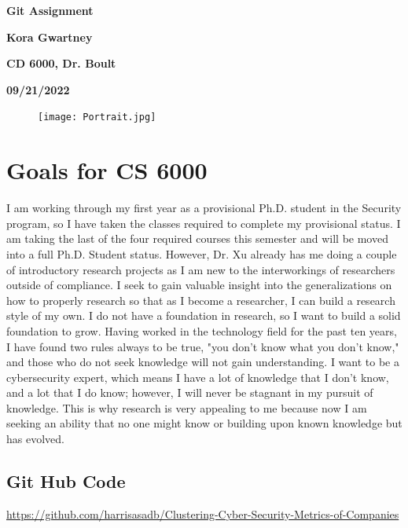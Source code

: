 \documentclass[fleqn,10pt]{olplainarticle}
\begin{document}
\begin{center}
    \Large
    \textbf{Git Assignment}  
        
    \vspace{0.4cm}
    \textbf{Kora Gwartney}

    \vspace{0.4cm}
    \textbf{CD 6000, Dr. Boult}
    
     \vspace{0.4cm}
    \textbf{09/21/2022}
\end{center}

\begin{figure}[ht]
\centering
\texttt{[image: Portrait.jpg]}
\label{fig:view}
\end{figure}
\bigskip

\section*{Goals for CS 6000 }
I am working through my first year as a provisional Ph.D. student in the Security program, so I have taken the classes required to complete my provisional status. I am taking the last of the four required courses this semester and will be moved into a full Ph.D. Student status. However, Dr. Xu already has me doing a couple of introductory research projects as I am new to the interworkings of researchers outside of compliance. I seek to gain valuable insight into the generalizations on how to properly research so that as I become a researcher, I can build a research style of my own. I do not have a foundation in research, so I want to build a solid foundation to grow. Having worked in the technology field for the past ten years, I have found two rules always to be true, "you don't know what you don't know," and those who do not seek knowledge will not gain understanding. I want to be a cybersecurity expert, which means I have a lot of knowledge that I don't know, and a lot that I do know; however, I will never be stagnant in my pursuit of knowledge. This is why research is very appealing to me because now I am seeking an ability that no one might know or building upon known knowledge but has evolved.  


\subsection{Git Hub Code}

\url{https://github.com/harrisasadb/Clustering-Cyber-Security-Metrics-of-Companies}
\end{document}
